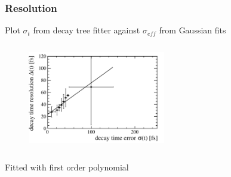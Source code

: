 \documentclass[]{beamer}
\begin{document}
\begin{frame}
\frametitle{Resolution}

Plot $\sigma_{t}$ from decay tree fitter against $\sigma_{eff}$ from Gaussian fits 

\begin{figure}
\includegraphics[width=6.0cm,height=4.7cm]{plots/ProperTimeReso_MC_onlyDsKpipi.pdf}
\end{figure}

Fitted with first order polynomial 

\end{frame}
\end{document}
